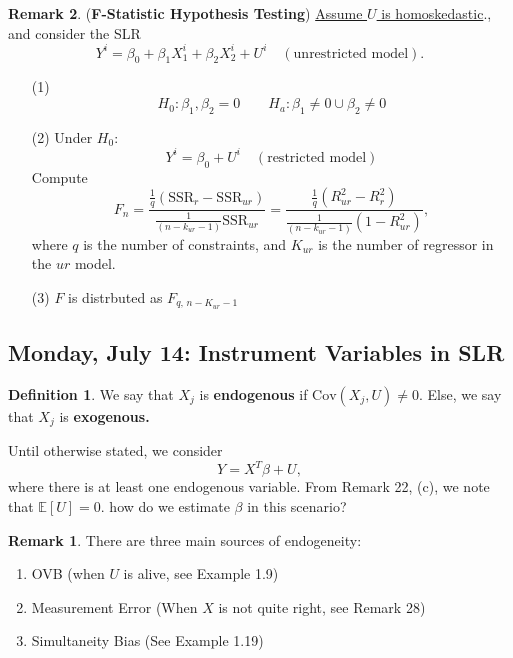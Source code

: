 \documentclass[10pt, oneside]{article}
\newcommand{\Cov}{\text{Cov}}
\newcommand{\bbE}{\mathbb{E}}
\theoremstyle{definition}
\newtheorem{defn}{Definition}
\newtheorem{rem}{Remark}
\begin{document}
\begin{rem}
(\textbf{F-Statistic Hypothesis Testing})
\underline{Assume $U$ is homoskedastic}., and consider the SLR
\[Y^i = \beta_0 + \beta_1 X_{1}^i + \beta_2 X_{2}^i + U^i \quad (\text{unrestricted model}).\] 
\begin{enumerate}
    \item [(1)] \[H_0: \beta_1, \beta_2 = 0 \qquad H_a: \beta_1 \neq 0\cup \beta_2 \neq 0\]
    \item [(2)] Under $H_0:$ \[Y^i = \beta_0  + U^i \quad (\text{restricted model})\] Compute 
    \[F_n = \frac{\frac{1}{q}\left(\text{SSR}_r - \text{SSR}_{ur}\right)}{ \frac{1}{(n - k_{ur} - 1)}\text{SSR}_{ur}} = \frac{\frac{1}{q}\left(R^2_{ur} - R^2_r\right)}{ \frac{1}{(n - k_{ur} - 1)}(1-R^2_{ur})}, \] where $q$ is the number of constraints, and $K_{ur}$ is the number of regressor in the $ur$ model.
    \item [(3)] $F$ is distrbuted as $F_{q, \,n-K_{ur}- 1}$
\end{enumerate}


\newpage
\subsection{Monday, July 14: Instrument Variables in SLR}
\begin{defn}We say that $X_j$ is \textbf{endogenous} if $\Cov(X_j, U) \neq 0.$ Else, we say that $X_j$ is \textbf{exogenous.}
\end{defn}

Until otherwise stated, we consider 
\[Y = X^T\beta + U,\] where there is at least one endogenous variable. From Remark 22, (c), we note that $\bbE[U] = 0.$ how do we estimate $\beta$ in this scenario?
\begin{rem}
    There are three main sources of endogeneity:
    \begin{enumerate}
        \item OVB (when $U$ is alive, see Example 1.9)
        \item Measurement Error (When $X$ is not quite right, see Remark 28)
        \item Simultaneity Bias (See Example 1.19)
    \end{enumerate}
\end{rem}


\end{rem}
\end{document}
